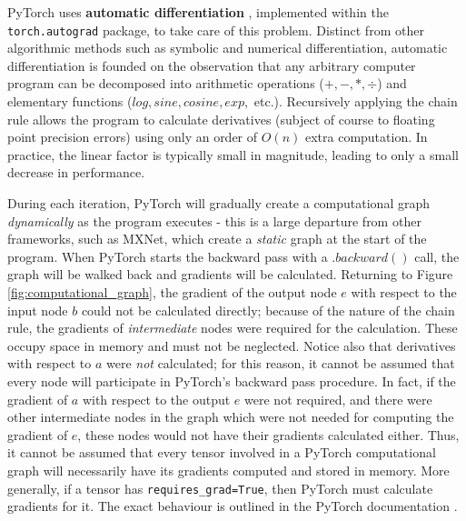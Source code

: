 \documentclass[12pt,letterpaper]{article}
\begin{document}
PyTorch uses \textbf{automatic differentiation} \cite{automatic_differentiation}, implemented within the \texttt{torch.autograd} package, to take care of this problem. Distinct from other algorithmic methods such as symbolic and numerical differentiation, automatic differentiation is founded on the observation that any arbitrary computer program can be decomposed into arithmetic operations ($+,-,*,\div$) and elementary functions ($log, sine, cosine, exp,$ etc.). Recursively applying the chain rule allows the program to calculate derivatives (subject of course to floating point precision errors) using only an order of $O(n)$ extra computation. In practice, the linear factor is typically small in magnitude, leading to only a small decrease in performance.
\par 

During each iteration, PyTorch will gradually create a computational graph \textit{dynamically} as the program executes - this is a large departure from other frameworks, such as MXNet, which create a \textit{static} graph at the start of the program. When PyTorch starts the backward pass with a $.backward()$ call, the graph will be walked back and gradients will be calculated. Returning to Figure \ref{fig:computational_graph}, the gradient of the output node $e$ with respect to the input node $b$ could not be calculated directly; because of the nature of the chain rule, the gradients of \textit{intermediate} nodes were required for the calculation. These occupy space in memory and must not be neglected. Notice also that derivatives with respect to $a$ were \textit{not} calculated; for this reason, it cannot be assumed that every node will participate in PyTorch's backward pass procedure. In fact, if the gradient of $a$ with respect to the output $e$ were not required, and there were other intermediate nodes in the graph which were not needed for computing the gradient of $e$, these nodes would not have their gradients calculated either. Thus, it cannot be assumed that every tensor involved in a PyTorch computational graph will necessarily have its gradients computed and stored in memory. More generally, if a tensor has \texttt{requires\_grad=True}, then PyTorch must calculate gradients for it. The exact behaviour is outlined in the PyTorch documentation \cite{pytorch_doc_leaf_requires_grad}. 
\par 
\end{document}
